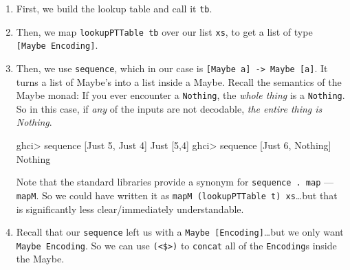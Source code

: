 \documentclass[]{article}
\newenvironment{Shaded}{}{}
\newcommand{\DataTypeTok}[1]{\textcolor[rgb]{0.56,0.13,0.00}{{#1}}}
\newcommand{\DecValTok}[1]{\textcolor[rgb]{0.25,0.63,0.44}{{#1}}}
\newcommand{\FunctionTok}[1]{\textcolor[rgb]{0.02,0.16,0.49}{{#1}}}
\newcommand{\NormalTok}[1]{{#1}}
\begin{document}
\begin{enumerate}
\def\labelenumi{\arabic{enumi}.}
\item
  First, we build the lookup table and call it \texttt{tb}.
\item
  Then, we map \texttt{lookupPTTable\ tb} over our list \texttt{xs}, to
  get a list of type \texttt{{[}Maybe\ Encoding{]}}.
\item
  Then, we use \texttt{sequence}, which in our case is
  \texttt{{[}Maybe\ a{]}\ -\textgreater{}\ Maybe\ {[}a{]}}. It turns a
  list of Maybe's into a list inside a Maybe. Recall the semantics of
  the Maybe monad: If you ever encounter a \texttt{Nothing}, the
  \emph{whole thing} is a \texttt{Nothing}. So in this case, if
  \emph{any} of the inputs are not decodable, \emph{the entire thing is
  Nothing}.

\begin{Shaded}
\begin{Highlighting}[]
\NormalTok{ghci}\FunctionTok{>} \NormalTok{sequence [}\DataTypeTok{Just} \DecValTok{5}\NormalTok{, }\DataTypeTok{Just} \DecValTok{4}\NormalTok{]}
\DataTypeTok{Just} \NormalTok{[}\DecValTok{5}\NormalTok{,}\DecValTok{4}\NormalTok{]}
\NormalTok{ghci}\FunctionTok{>} \NormalTok{sequence [}\DataTypeTok{Just} \DecValTok{6}\NormalTok{, }\DataTypeTok{Nothing}\NormalTok{]}
\DataTypeTok{Nothing}
\end{Highlighting}
\end{Shaded}

  Note that the standard libraries provide a synonym for
  \texttt{sequence\ .\ map} --- \texttt{mapM}. So we could have written
  it as \texttt{mapM\ (lookupPTTable\ t)\ xs}\ldots{}but that is
  significantly less clear/immediately understandable.
\item
  Recall that our \texttt{sequence} left us with a
  \texttt{Maybe\ {[}Encoding{]}}\ldots{}but we only want
  \texttt{Maybe\ Encoding}. So we can use
  \texttt{(\textless{}\$\textgreater{})} to \texttt{concat} all of the
  \texttt{Encoding}s inside the Maybe.
\end{enumerate}
\end{document}
